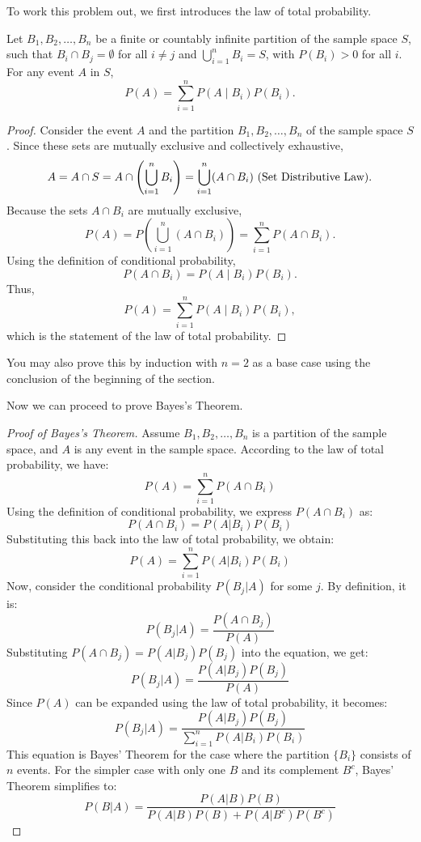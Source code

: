        To work this problem out, we first introduces the law of total probability.
       \begin{theorem}
       	Let \(B_1, B_2, \ldots, B_n\) be a finite or countably infinite partition of the sample space \(S\), such that \(B_i \cap B_j = \emptyset\) for all \(i \neq j\) and \(\bigcup_{i=1}^n B_i = S\), with \(P(B_i) > 0\) for all \(i\). For any event \(A\) in \(S\),
       	\[
       	P(A) = \sum_{i=1}^n P(A \mid B_i) P(B_i).
       	\]
       \end{theorem}
       \begin{proof}
       	Consider the event \(A\) and the partition \(B_1, B_2, \ldots, B_n\) of the sample space \(S\). Since these sets are mutually exclusive and collectively exhaustive,
       	\[
       	A = A \cap S = A \cap \left( \bigcup_{i=1}^n B_i \right) = \bigcup_{i=1}^n (A \cap B_i) \text{ (Set Distributive Law)}.
       	\]
       	Because the sets \(A \cap B_i\) are mutually exclusive,
       	\[
       	P(A) = P\left( \bigcup_{i=1}^n (A \cap B_i) \right) = \sum_{i=1}^n P(A \cap B_i).
       	\]
       	Using the definition of conditional probability,
       	\[
       	P(A \cap B_i) = P(A \mid B_i) P(B_i).
       	\]
       	Thus,
       	\[
       	P(A) = \sum_{i=1}^n P(A \mid B_i) P(B_i),
       	\]
       	which is the statement of the law of total probability.
       \end{proof}
       \begin{remark}
       	You may also prove this by induction with $n=2$ as a base case using the conclusion of the beginning of the section.
       \end{remark}
       Now we can proceed to prove Bayes's Theorem.
       \begin{proof}[Proof of Bayes's Theorem]
       	Assume \( B_1, B_2, \ldots, B_n \) is a partition of the sample space, and \( A \) is any event in the sample space. According to the law of total probability, we have:
       	\[
       	P(A) = \sum_{i=1}^n P(A \cap B_i)
       	\]
       	Using the definition of conditional probability, we express \( P(A \cap B_i) \) as:
       	\[
       	P(A \cap B_i) = P(A | B_i)P(B_i)
       	\]
       	Substituting this back into the law of total probability, we obtain:
       	\[
       	P(A) = \sum_{i=1}^n P(A | B_i)P(B_i)
       	\]
       	Now, consider the conditional probability \( P(B_j | A) \) for some \( j \). By definition, it is:
       	\[
       	P(B_j | A) = \frac{P(A \cap B_j)}{P(A)}
       	\]
       	Substituting \( P(A \cap B_j) = P(A | B_j)P(B_j) \) into the equation, we get:
       	\[
       	P(B_j | A) = \frac{P(A | B_j)P(B_j)}{P(A)}
       	\]
       	Since \( P(A) \) can be expanded using the law of total probability, it becomes:
       	\[
       	P(B_j | A) = \frac{P(A | B_j)P(B_j)}{\sum_{i=1}^n P(A | B_i)P(B_i)}
       	\]
       	This equation is Bayes' Theorem for the case where the partition \( \{B_i\} \) consists of \( n \) events. For the simpler case with only one \( B \) and its complement \( B^c \), Bayes' Theorem simplifies to:
       	\[
       	P(B | A) = \frac{P(A | B)P(B)}{P(A | B)P(B) + P(A | B^c)P(B^c)}
       	\]
       \end{proof}
